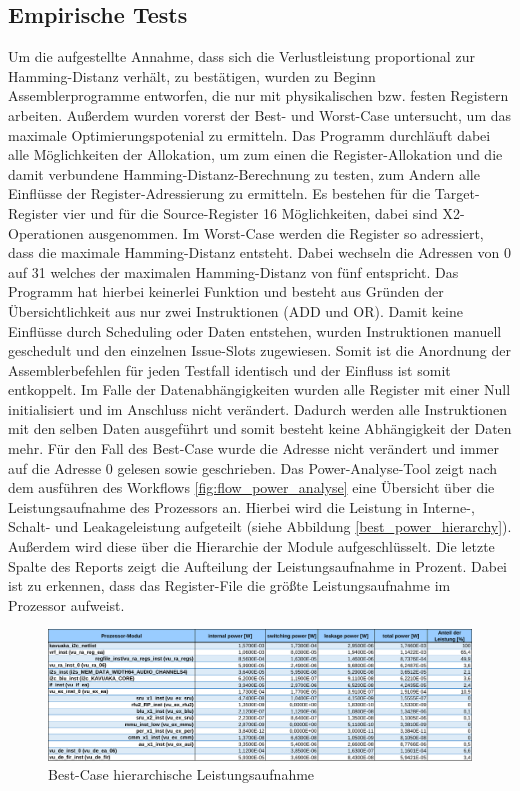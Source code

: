 \subsection{Empirische Tests}
\label{cap:empirischeTests}
Um die aufgestellte Annahme, dass sich die Verlustleistung proportional zur Hamming-Distanz verhält, zu bestätigen, wurden zu Beginn Assemblerprogramme entworfen, die nur mit physikalischen bzw. festen Registern arbeiten.
Außerdem wurden vorerst der Best- und Worst-Case untersucht, um das maximale Optimierungspotenial zu ermitteln. Das Programm durchläuft dabei alle Möglichkeiten der Allokation, um zum einen die Register-Allokation und die damit verbundene Hamming-Distanz-Berechnung zu testen, zum Andern alle Einflüsse der Register-Adressierung zu ermitteln. Es bestehen für die Target-Register vier und für die Source-Register 16 Möglichkeiten, dabei sind X2-Operationen ausgenommen. Im Worst-Case werden die Register so adressiert, dass die maximale Hamming-Distanz entsteht. Dabei wechseln die Adressen von 0 auf 31 welches der maximalen Hamming-Distanz von fünf entspricht. Das Programm hat hierbei keinerlei Funktion und besteht aus Gründen der Übersichtlichkeit aus nur zwei Instruktionen (ADD und OR). Damit keine Einflüsse durch Scheduling oder Daten entstehen, wurden Instruktionen manuell geschedult und den einzelnen Issue-Slots zugewiesen. Somit ist die Anordnung der Assemblerbefehlen für jeden Testfall identisch und der Einfluss ist somit entkoppelt. Im Falle der Datenabhängigkeiten wurden alle Register mit einer Null initialisiert und im Anschluss nicht verändert. Dadurch werden alle Instruktionen mit den selben Daten ausgeführt und somit besteht keine Abhängigkeit der Daten mehr.
Für den Fall des Best-Case wurde die Adresse nicht verändert und immer auf die Adresse 0 gelesen sowie geschrieben.
Das Power-Analyse-Tool zeigt nach dem ausführen des Workflows \ref{fig:flow_power_analyse} eine Übersicht über die Leistungsaufnahme des Prozessors an. Hierbei wird die Leistung in Interne-, Schalt- und Leakageleistung aufgeteilt (siehe Abbildung \ref{best_power_hierarchy}). Außerdem wird diese über die Hierarchie der Module aufgeschlüsselt. Die letzte Spalte des Reports zeigt die Aufteilung der Leistungsaufnahme in Prozent. Dabei ist zu erkennen, dass das Register-File die größte Leistungsaufnahme im Prozessor aufweist.

\begin{figure}[H] 
	\centering
	\includegraphics[width=\textwidth]{fig/best_hierarchy_report.pdf}
	\caption{Best-Case hierarchische Leistungsaufnahme}
	\label{fig:best_power_hierarchy}
\end{figure}

